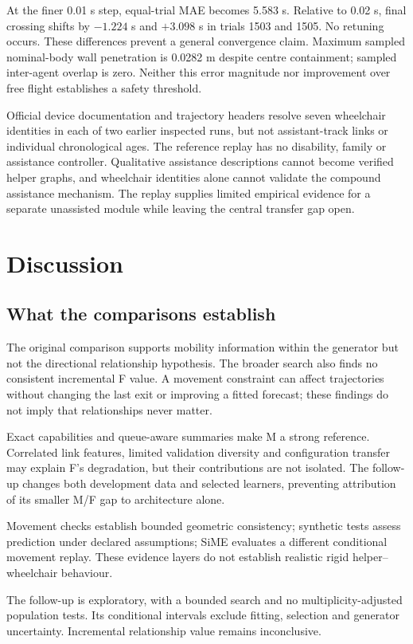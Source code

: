 At the finer 0.01 s step, equal-trial MAE becomes 5.583 s. Relative to 0.02 s, final crossing shifts by $-1.224$ s and $+3.098$ s in trials 1503 and 1505. No retuning occurs. These differences prevent a general convergence claim. Maximum sampled nominal-body wall penetration is 0.0282 m despite centre containment; sampled inter-agent overlap is zero. Neither this error magnitude nor improvement over free flight establishes a safety threshold.

Official device documentation and trajectory headers resolve seven wheelchair identities in each of two earlier inspected runs, but not assistant-track links or individual chronological ages. The reference replay has no disability, family or assistance controller. Qualitative assistance descriptions cannot become verified helper graphs, and wheelchair identities alone cannot validate the compound assistance mechanism. The replay supplies limited empirical evidence for a separate unassisted module while leaving the central transfer gap open.

\section{Discussion}
\subsection{What the comparisons establish}
The original comparison supports mobility information within the generator but not the directional relationship hypothesis. The broader search also finds no consistent incremental F value. A movement constraint can affect trajectories without changing the last exit or improving a fitted forecast; these findings do not imply that relationships never matter.

Exact capabilities and queue-aware summaries make M a strong reference. Correlated link features, limited validation diversity and configuration transfer may explain F's degradation, but their contributions are not isolated. The follow-up changes both development data and selected learners, preventing attribution of its smaller M/F gap to architecture alone.

Movement checks establish bounded geometric consistency; synthetic tests assess prediction under declared assumptions; SiME evaluates a different conditional movement replay. These evidence layers do not establish realistic rigid helper--wheelchair behaviour.

The follow-up is exploratory, with a bounded search and no multiplicity-adjusted population tests. Its conditional intervals exclude fitting, selection and generator uncertainty. Incremental relationship value remains inconclusive.

